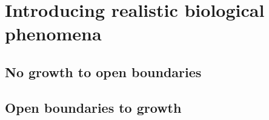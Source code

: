 
\section{Introducing realistic biological phenomena}
\subsection{No growth to open boundaries}
\subsection{Open boundaries to growth}

